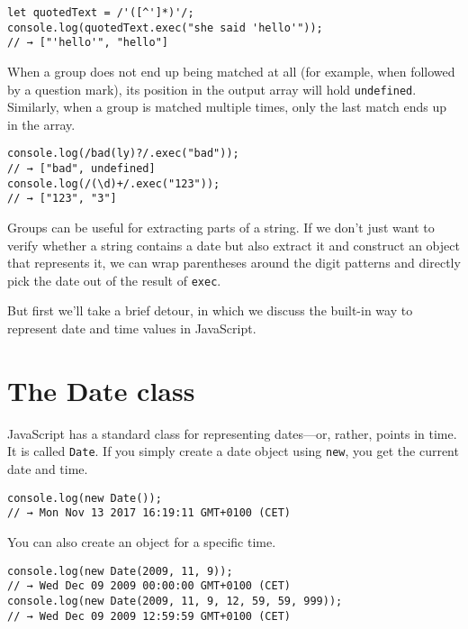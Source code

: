 \begin{lstlisting}
let quotedText = /'([^']*)'/;
console.log(quotedText.exec("she said 'hello'"));
// → ["'hello'", "hello"]
\end{lstlisting}
\noindent{}

When a group does not end up being matched at all (for example, when followed by a question mark), its position in the output array will hold \lstinline`undefined`. Similarly, when a group is matched multiple times, only the last match ends up in the array.

\begin{lstlisting}
console.log(/bad(ly)?/.exec("bad"));
// → ["bad", undefined]
console.log(/(\d)+/.exec("123"));
// → ["123", "3"]
\end{lstlisting}
\noindent{}

Groups can be useful for extracting parts of a string. If we don't just want to verify whether a string contains a date but also extract it and construct an object that represents it, we can wrap parentheses around the digit patterns and directly pick the date out of the result of \lstinline`exec`.

But first we'll take a brief detour, in which we discuss the built-in way to represent date and time values in JavaScript.

\section{The Date class}

JavaScript has a standard class for representing dates—or, rather, points in time. It is called \lstinline`Date`. If you simply create a date object using \lstinline`new`, you get the current date and time.

\begin{lstlisting}
console.log(new Date());
// → Mon Nov 13 2017 16:19:11 GMT+0100 (CET)
\end{lstlisting}
\noindent{}

You can also create an object for a specific time.

\begin{lstlisting}
console.log(new Date(2009, 11, 9));
// → Wed Dec 09 2009 00:00:00 GMT+0100 (CET)
console.log(new Date(2009, 11, 9, 12, 59, 59, 999));
// → Wed Dec 09 2009 12:59:59 GMT+0100 (CET)
\end{lstlisting}
\noindent{}

